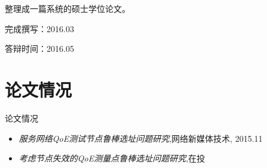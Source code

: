 \documentclass[10pt]{beamer}
\begin{document}
\begin{frame}
  
   整理成一篇系统的硕士学位论文。

完成撰写：2016.03

答辩时间：2016.05
\end{frame}
\section{论文情况}
\begin{frame}{论文情况}

 \begin{itemize}
   \item  {\em 服务网络QoE测试节点鲁棒选址问题研究},网络新媒体技术, 2015.11
   \item  {\em 考虑节点失效的QoE测量点鲁棒选址问题研究},在投
 \end{itemize}
  

\end{frame}




\end{document}
